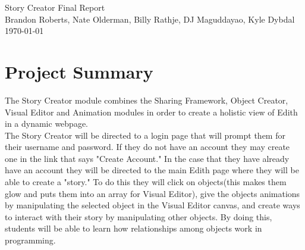 \documentclass[12pt]{article}
\begin{document}

\begin{titlepage}
        \vspace*{\fill} %
        \begin{center}
                {\Huge Story Creator Final Report}\\ [0.5cm]        
                
                {\Large Brandon Roberts, Nate Olderman, Billy Rathje, DJ Maguddayao, Kyle Dybdal}\\[0.4cm]
                \today %
        \end{center}
        \vspace*{\fill}
\end{titlepage}

\section{Project Summary}
The Story Creator module combines the Sharing Framework, Object Creator, Visual Editor and Animation modules in order to create a holistic view of Edith in a dynamic webpage. \\

The Story Creator will be directed to a login page that will prompt them for their username and password.  If they do not have an account they may create one in the link that says "Create Account."  In the case that they have already have an account they will be directed to the main Edith page where they will be able to create a "story." To do this they will click on objects(this makes them glow and puts them into an array for Visual Editor), give the objects animations by manipulating the selected object in the Visual Editor canvas, and create ways to interact with their story by manipulating other objects. By doing this, students will be able to learn how relationships among objects work in programming. \\
\end{document}
